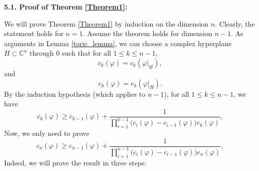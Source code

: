 \documentclass[a4paper,oneside,reqno,11pt]{article}
\begin{document}
{\bf 5.1. Proof of Theorem \ref{Theorem1}:}

We will prove Theorem \ref{Theorem1} by induction on the dimension $n$. Clearly, the statement holds for $n=1$. Assume the theorem holds for dimension $n-1$. As arguments in Lemma \ref{toric_lemma}, we can choose a complex hyperplane $H\subset\mathbb C^n$ through $0$ such that for all $1\leq k\leq n - 1$,
$$c_k(\varphi ) = c_k(\varphi |_{ H }),$$
and 
$$e_k(\varphi ) = e_k(\varphi |_{ H }).$$
By the induction hypothesis (which applies to $n-1$), for all $1\leq k\leq n-1$, we have 
$$c_k (\varphi) \geq c_{ k - 1} (\varphi ) + \frac { 1 } { \prod\limits_{ i = 1 }^{ k - 1 } \big( c_{ i } ( \varphi ) - c_{ i - 1 } ( \varphi ) \big) e_k (\varphi ) },$$
Now, we only need to prove
$$c_n (\varphi) \geq c_{ n - 1} (\varphi ) + \frac { 1 } { \prod\limits_{ i = 1 }^{ n - 1 } \big( c_{ i } ( \varphi ) - c_{ i - 1 } ( \varphi ) \big) e_n (\varphi ) },$$
 Indeed, we will prove the result in three steps:
\end{document}

